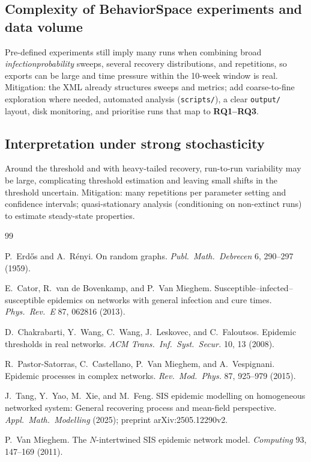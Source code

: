 \documentclass[11pt,a4paper]{article}
\begin{document}
\subsection*{Complexity of BehaviorSpace experiments and data volume}

Pre-defined experiments still imply many runs when combining broad \emph{infection\-probability} sweeps, several recovery distributions, and repetitions, so exports can be large and time pressure within the 10-week window is real. Mitigation: the XML already structures sweeps and metrics; add coarse-to-fine exploration where needed, automated analysis (\texttt{scripts/}), a clear \texttt{output/} layout, disk monitoring, and prioritise runs that map to \textbf{RQ1--RQ3}.

\subsection*{Interpretation under strong stochasticity}

Around the threshold and with heavy-tailed recovery, run-to-run variability may be large, complicating threshold estimation and leaving small shifts in the threshold uncertain. Mitigation: many repetitions per parameter setting and confidence intervals; quasi-stationary analysis (conditioning on non-extinct runs) to estimate steady-state properties.

\begin{thebibliography}{99}

P.~Erd\H{o}s and A.~R\'enyi.
\newblock On random graphs.
\newblock \emph{Publ.\ Math.\ Debrecen} 6, 290--297 (1959).

E.~Cator, R.~van de Bovenkamp, and P.~Van Mieghem.
\newblock Susceptible--infected--susceptible epidemics on networks with general infection and cure times.
\newblock \emph{Phys.\ Rev.\ E} 87, 062816 (2013).

D.~Chakrabarti, Y.~Wang, C.~Wang, J.~Leskovec, and C.~Faloutsos.
\newblock Epidemic thresholds in real networks.
\newblock \emph{ACM Trans.\ Inf.\ Syst.\ Secur.} 10, 13 (2008).

R.~Pastor-Satorras, C.~Castellano, P.~Van Mieghem, and A.~Vespignani.
\newblock Epidemic processes in complex networks.
\newblock \emph{Rev.\ Mod.\ Phys.} 87, 925--979 (2015).

J.~Tang, Y.~Yao, M.~Xie, and M.~Feng.
\newblock SIS epidemic modelling on homogeneous networked system: General recovering process and mean-field perspective.
\newblock \emph{Appl.\ Math.\ Modelling} (2025); preprint arXiv:2505.12290v2.

P.~Van Mieghem.
\newblock The $N$-intertwined SIS epidemic network model.
\newblock \emph{Computing} 93, 147--169 (2011).

\end{thebibliography}
\end{document}
